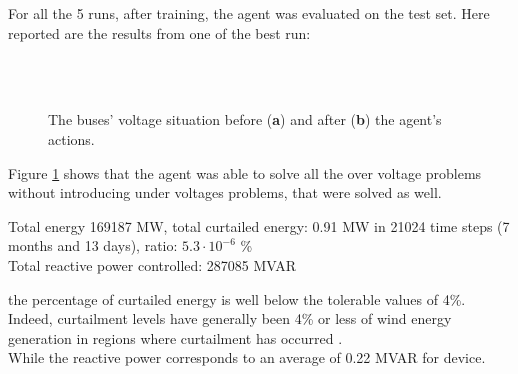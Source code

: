 For all the 5 runs, after training, the agent was evaluated on the test set. Here reported are the results from one of the best run:
\begin{figure}[H]
\centering
    \\
    
    \\

    \caption[Agent's solution to voltage problems]{The buses' voltage situation before (\textbf{a}) and after (\textbf{b}) the agent's actions.}
    \label{im:4_prosolv}
\end{figure}
\noindent Figure \ref{im:4_prosolv} shows that the agent was able to solve all the over voltage problems without introducing under voltages problems, that were solved as well.

\begin{algorithm}
    \STATE Total energy 169187 MW, total curtailed energy: 0.91 MW in 21024 time steps (7 months and 13 days), ratio: $5.3 \cdot 10^{-6}$ \%\\
    
    \STATE Total reactive power controlled: 287085 M\gls{VAR}
\end{algorithm}
\noindent the percentage of curtailed energy is well below the tolerable values of 4\%. Indeed, curtailment levels have generally been 4\% or less of wind energy generation in regions where curtailment has occurred \cite{enercurt}.\\
While the reactive power corresponds to an average of 0.22 M\gls{VAR} for device.\\

